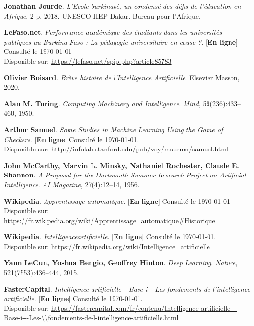 \adjustmtc
\renewcommand\bibname{BIBLIOGRAPHIE}
\begin{thebibliography}{9}
\thispagestyle{MyStyle}

\textbf{Jonathan Jourde}. \emph{L'Ecole burkinabè, un condensé des défis de l'éducation en Afrique}. 2 p. 2018. UNESCO IIEP Dakar. Bureau pour l’Afrique.

\textbf{LeFaso.net}. \emph{Performance académique des étudiants dans les universités publiques au Burkina Faso : La pédagogie universitaire en cause ?}. [\textbf{En ligne}] Consulté le \today \\Disponible sur:
\url{https://lefaso.net/spip.php?article85783}

\textbf{Olivier Boisard}. \emph{Brève histoire de l’Intelligence Artificielle}. Elsevier Masson, 2020.

\textbf{Alan M. Turing}. \emph{Computing Machinery and Intelligence}. \emph{Mind}, 59(236):433--460, 1950.

\textbf{Arthur Samuel}. \emph{Some Studies in Machine Learning Using the Game of Checkers}. [\textbf{En ligne}] Consulté le \today. \\ Disponible sur:
\url{http://infolab.stanford.edu/pub/voy/museum/samuel.html}

\textbf{John McCarthy, Marvin L. Minsky, Nathaniel Rochester, Claude E. Shannon}. \emph{A Proposal for the Dartmouth Summer Research Project on Artificial Intelligence}. \emph{AI Magazine}, 27(4):12--14, 1956.

\textbf{Wikipedia}. \emph{Apprentissage automatique}. [\textbf{En ligne}] Consulté le \today. \\Disponible sur:
\url{https://fr.wikipedia.org/wiki/Apprentissage_automatique#Historique}

\textbf{Wikipedia}. \emph{Intelligenceartificielle}. [\textbf{En ligne}] Consulté le \today. \\Disponible sur:
\url{https://fr.wikipedia.org/wiki/Intelligence_artificielle}

\textbf{Yann LeCun, Yoshua Bengio, Geoffrey Hinton}. \emph{Deep Learning}. \emph{Nature}, 521(7553):436--444, 2015.

\textbf{FasterCapital}. \emph{Intelligence artificielle - Base i - Les fondements de l'intelligence artificielle}. [\textbf{En ligne}] Consulté le \today. \\Disponible sur:
\url{https://fastercapital.com/fr/contenu/Intelligence-artificielle---Base-i---Les-\\fondements-de-l-intelligence-artificielle.html}



\end{thebibliography}
